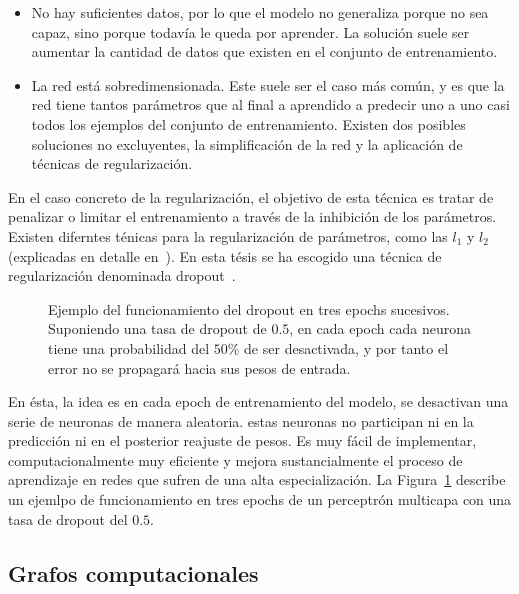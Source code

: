 \begin{itemize}
	\item No hay suficientes datos, por lo que el modelo no generaliza porque no sea capaz, sino porque todavía le queda por aprender. La solución suele ser aumentar la cantidad de datos que existen en el conjunto de entrenamiento.
	\item La red está sobredimensionada. Este suele ser el caso más común, y es que la red tiene tantos parámetros que al final a aprendido a predecir uno a uno casi todos los ejemplos del conjunto de entrenamiento. Existen dos posibles soluciones no excluyentes, la simplificación de la red y la aplicación de técnicas de regularización.
\end{itemize}

En el caso concreto de la regularización, el objetivo de esta técnica es tratar de penalizar o limitar el entrenamiento a través de la inhibición de los parámetros. Existen diferntes ténicas para la regularización de parámetros, como las $l_1$ y $l_2$ (explicadas en detalle en~\cite{ng2004feature}). En esta tésis se ha escogido una técnica de regularización denominada dropout~\cite{srivastava2014dropout}.

\begin{figure}[t]
	\centering
	\qquad
	\qquad
	\caption[Ejemplo de la operación de dropout en tres epochs sucesivos.]{Ejemplo del funcionamiento del dropout en tres epochs sucesivos. Suponiendo una tasa de dropout de $0.5$, en cada epoch cada neurona tiene una probabilidad del $50\%$ de ser desactivada, y por tanto el error no se propagará hacia sus pesos de entrada.}
	\label{fig:dropout-example}
\end{figure}

En ésta, la idea es en cada epoch de entrenamiento del modelo, se desactivan una serie de neuronas de manera aleatoria. estas neuronas no participan ni en la predicción ni en el posterior reajuste de pesos. Es muy fácil de implementar, computacionalmente muy eficiente y mejora sustancialmente el proceso de aprendizaje en redes que sufren de una alta especialización. La Figura~\ref{fig:dropout-example} describe un ejemlpo de funcionamiento en tres epochs de un perceptrón multicapa con una tasa de dropout del $0.5$.

\subsection{Grafos computacionales}

